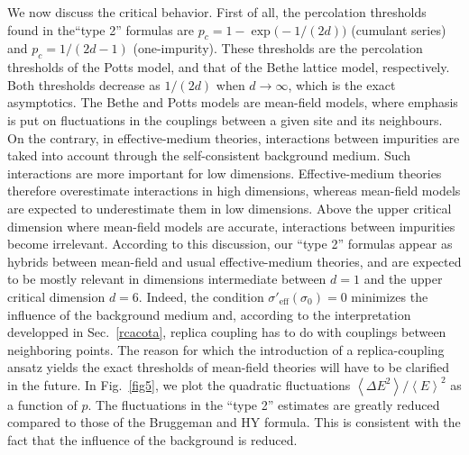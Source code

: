 We now discuss the critical behavior. First of all, the percolation
thresholds found in the``type 2'' formulas are
$p_c=1-\exp\bigl(-1/(2d)\bigr)$ (cumulant series) and $p_c=1/(2d-1)$
(one-impurity). These thresholds are the percolation thresholds of the
Potts model, and that of the Bethe lattice model, respectively. Both
thresholds decrease as $1/(2d)$ when $d\to\infty$, which is the exact
asymptotics. The Bethe and Potts models are mean-field models, where
emphasis is put on fluctuations in the couplings between a given site
and its neighbours. On the contrary, in effective-medium theories,
interactions between impurities are taked into account through the
self-consistent background medium. Such interactions are more
important for low dimensions. Effective-medium theories therefore
overestimate interactions in high dimensions, whereas mean-field
models are expected to underestimate them in low dimensions. Above the
upper critical dimension where mean-field models are accurate,
interactions between impurities become irrelevant. According to this
discussion, our ``type 2'' formulas appear as hybrids between
mean-field and usual effective-medium theories, and are expected to be
mostly relevant in dimensions intermediate between $d=1$ and the upper
critical dimension $d=6$.  Indeed, the condition
$\sigma'_{\text{eff}}(\sigma_0)=0$ minimizes the influence of the
background medium and, according to the interpretation developped in
Sec.\ \ref{rcacota}, replica coupling has to do with couplings
between neighboring points. The reason for which the introduction of a
replica-coupling ansatz yields the exact thresholds of mean-field
theories will have to be clarified in the future.  In Fig.\
\ref{fig5}, we plot the quadratic fluctuations $\left\langle\Delta
E^2\right\rangle/\left\langle E\right\rangle^2$ as a function of
$p$. The fluctuations in the ``type 2'' estimates are greatly reduced
compared to those of the Bruggeman and HY formula. This is consistent
with the fact that the influence of the background is reduced.

